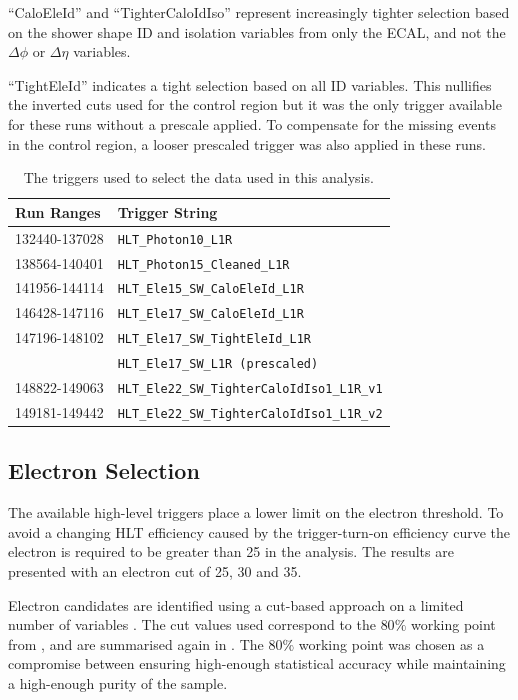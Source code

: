 ``CaloEleId'' and ``TighterCaloIdIso'' represent increasingly tighter selection
based on the shower shape ID and isolation variables from only the {ECAL},
and not the $\Delta\phi$ or $\Delta\eta$ variables.  


``TightEleId'' indicates a tight selection based on all ID variables. 
This nullifies the inverted cuts used for the control region but
it was the only trigger available for these runs without a prescale applied.
To compensate for the missing events in the control region, a looser prescaled
trigger was also applied in these runs.

\begin{table}[htbp]
  \centering
  \begin{tabular}{ l l }
    \toprule
    Run Ranges & Trigger String\\
    \midrule
    132440-137028 & \verb=HLT_Photon10_L1R= \\
    138564-140401 & \verb=HLT_Photon15_Cleaned_L1R= \\
    141956-144114 & \verb=HLT_Ele15_SW_CaloEleId_L1R= \\
    146428-147116 & \verb=HLT_Ele17_SW_CaloEleId_L1R= \\
    147196-148102 & \verb=HLT_Ele17_SW_TightEleId_L1R= \\
                  & \verb=HLT_Ele17_SW_L1R (prescaled)= \\ 
    148822-149063 & \verb=HLT_Ele22_SW_TighterCaloIdIso1_L1R_v1= \\
    149181-149442 & \verb=HLT_Ele22_SW_TighterCaloIdIso1_L1R_v2= \\
    \bottomrule
  \end{tabular}
  \caption{The triggers used to select the data used in this analysis.}
  \label{tab:triggers}
\end{table}

\subsection{Electron Selection}
The available high-level triggers place a lower limit on the electron \pT
threshold.
To avoid a changing HLT efficiency caused by the trigger-turn-on efficiency
curve the electron \PT is required to be
greater than \unit{25}{\GeV} in the analysis. 
The results are presented with an electron \pT cut of 25, 30
and \unit{35}{\GeV}.

Electron candidates are identified using a cut-based approach on a limited
number of variables \cite{daskalakis2009data}.  The cut values used correspond
to the $80\%$ working point from , and are summarised
again in . The $80\%$ working point was chosen
as a compromise between ensuring high-enough statistical accuracy while maintaining
a high-enough purity of the sample.

